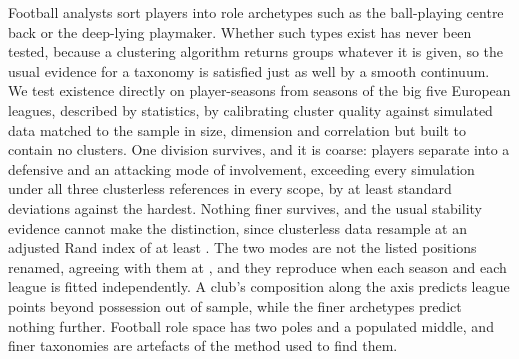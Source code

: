 Football analysts sort players into role archetypes such as the ball-playing centre back or
the deep-lying playmaker. Whether such types exist has never been tested, because a clustering
algorithm returns groups whatever it is given, so the usual evidence for a taxonomy is satisfied
just as well by a smooth continuum. We test existence directly on \ArcRows{} player-seasons from
\ArcNSeasonsWord{} seasons of the big five European leagues, described by \ArcFeatures{} statistics,
by calibrating cluster quality against simulated data matched to the sample in size, dimension
and correlation but built to contain no clusters. One division survives, and it is coarse:
players separate into a defensive and an attacking mode of involvement, exceeding every
simulation under all three clusterless references in every scope, by at least
\StrMinZOverall{} standard deviations against the hardest. Nothing finer survives, and the usual
stability evidence cannot make the distinction, since clusterless data resample at an adjusted
Rand index of at least \StrBootNullMinSingle{}. The two modes are not the listed positions
renamed, agreeing with them at \ArcARIvsPosition{}, and they reproduce when each season and each
league is fitted independently. A club's composition along the axis predicts league points beyond
possession out of sample, while the finer archetypes predict nothing further. Football role space
has two poles and a populated middle, and finer taxonomies are artefacts of the method used to
find them.
